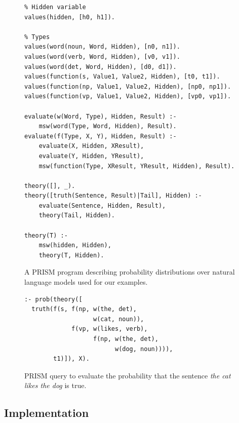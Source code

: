\documentclass[11pt]{article}
\theoremstyle{definition}
\begin{document}
\begin{figure}
\centering
\begin{lstlisting}
% Hidden variable
values(hidden, [h0, h1]).

% Types
values(word(noun, Word, Hidden), [n0, n1]).
values(word(verb, Word, Hidden), [v0, v1]).
values(word(det, Word, Hidden), [d0, d1]).
values(function(s, Value1, Value2, Hidden), [t0, t1]).
values(function(np, Value1, Value2, Hidden), [np0, np1]).
values(function(vp, Value1, Value2, Hidden), [vp0, vp1]).

evaluate(w(Word, Type), Hidden, Result) :-
	msw(word(Type, Word, Hidden), Result).
evaluate(f(Type, X, Y), Hidden, Result) :-
	evaluate(X, Hidden, XResult),
	evaluate(Y, Hidden, YResult),
	msw(function(Type, XResult, YResult, Hidden), Result).

theory([], _).
theory([truth(Sentence, Result)|Tail], Hidden) :-
	evaluate(Sentence, Hidden, Result),
	theory(Tail, Hidden).

theory(T) :-
	msw(hidden, Hidden),
	theory(T, Hidden).
\end{lstlisting}
\caption{A PRISM program describing probability distributions over
  natural language models used for our examples.}
\label{figure:program}
\end{figure}

\begin{figure}
\begin{lstlisting}
:- prob(theory([
  truth(f(s, f(np, w(the, det),
                   w(cat, noun)),
             f(vp, w(likes, verb),
                   f(np, w(the, det),
                         w(dog, noun)))),
        t1)]), X).
\end{lstlisting}
\caption{PRISM query to evaluate the probability that the sentence
  \emph{the cat likes the dog} is true.}
\label{figure:query}
\end{figure}



\subsection{Implementation}
\end{document}
